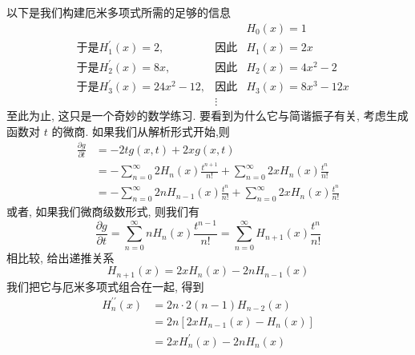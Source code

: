 以下是我们构建厄米多项式所需的足够的信息
\begin{equation}
\begin{aligned}
	&&&{H}_{0}\left( x\right) = 1\\
	&\text{于是}{H}_{1}^{\prime }\left( x\right) = 2,&\text{因此}&{H}_{1}\left( x\right) = {2x}\\
	&\text{于是}{H}_{2}^{\prime }\left( x\right) = {8x},&\text{因此}&{H}_{2}\left( x\right) = 4{x}^{2} - 2\\
	&\text{于是}{H}_{3}^{\prime }\left( x\right) = {24}{x}^{2} - {12},&\text{因此}&{H}_{3}\left( x\right) = 8{x}^{3} - {12x}\\
	&&\vdots&
\end{aligned}
\end{equation}
至此为止, 这只是一个奇妙的数学练习. 要看到为什么它与简谐振子有关, 考虑生成函数对 $t$ 的微商. 如果我们从解析形式开始,则
\begin{equation}
\begin{aligned}
	\frac{\partial g}{\partial t} &= - {2tg}\left( {x, t}\right) + {2xg}\left( {x, t}\right)\\
	&= - \mathop{\sum }\limits_{{n = 0}}^{\infty }2{H}_{n}\left( x\right) \frac{{t}^{n + 1}}{n!} + \mathop{\sum }\limits_{{n = 0}}^{\infty }{2x}{H}_{n}\left( x\right) \frac{{t}^{n}}{n!}\\
	&= - \mathop{\sum }\limits_{{n = 0}}^{\infty }{2n}{H}_{n - 1}\left( x\right) \frac{{t}^{n}}{n!} + \mathop{\sum }\limits_{{n = 0}}^{\infty }{2x}{H}_{n}\left( x\right) \frac{{t}^{n}}{n!}
\end{aligned}
\end{equation}
或者, 如果我们微商级数形式, 则我们有
\begin{equation}
\frac{\partial g}{\partial t} = \mathop{\sum }\limits_{{n = 0}}^{\infty }n{H}_{n}\left( x\right) \frac{{t}^{n - 1}}{n!} = \mathop{\sum }\limits_{{n = 0}}^{\infty }{H}_{n + 1}\left( x\right) \frac{{t}^{n}}{n!}
\end{equation}
相比较, 给出递推关系
\begin{equation}
{H}_{n + 1}\left( x\right) = {2x}{H}_{n}\left( x\right) - {2n}{H}_{n - 1}\left( x\right)
\end{equation}
我们把它与厄米多项式组合在一起, 得到
\begin{equation}
\begin{aligned}
	{H}^{\prime \prime }_{n}\left( x\right) &= {2n} \cdot 2\left( {n - 1}\right) {H}_{n - 2}\left( x\right)\\
	&= {2n}\left\lbrack {{2x}{H}_{n - 1}\left( x\right) - {H}_{n}\left( x\right) }\right\rbrack\\
	&= {2x}{H}_{n}^{\prime }\left( x\right) - {2n}{H}_{n}\left( x\right)
\end{aligned}
\end{equation}
